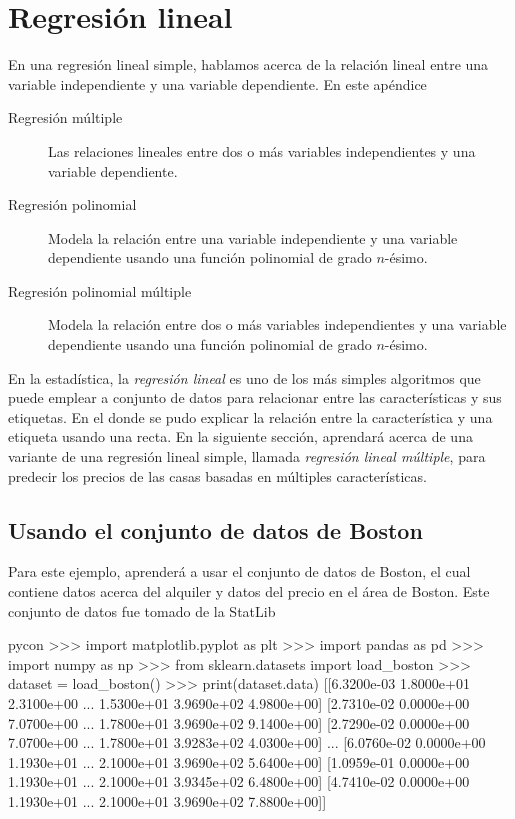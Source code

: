 \section{Regresión lineal}

En una regresión lineal simple, hablamos acerca de la relación lineal entre una variable independiente y una variable dependiente. En este apéndice

\begin{description}
	\item[Regresión múltiple] Las relaciones lineales entre dos o más variables independientes y una variable dependiente.
	\item[Regresión polinomial] Modela la relación entre una variable independiente y una variable dependiente usando una función polinomial de grado $n$-ésimo.
	\item[Regresión polinomial múltiple] Modela la relación entre dos o más variables independientes y una variable dependiente usando una función polinomial de grado $n$-ésimo.
\end{description}

En la estadística, la \emph{regresión lineal} es uno de los más simples algoritmos que puede emplear a conjunto de datos para relacionar entre las características y sus etiquetas. En el
donde se pudo explicar la relación entre la característica y una etiqueta usando una recta. En la siguiente sección, aprendará acerca de una variante de una regresión lineal simple, llamada \emph{regresión lineal múltiple}, para predecir los precios de las casas basadas en múltiples características.

\subsection{Usando el conjunto de datos de Boston}
Para este ejemplo, aprenderá a usar el conjunto de datos de Boston, el cual contiene datos acerca del alquiler y datos del precio en el área de Boston. Este conjunto de datos fue tomado de la StatLib

\begin{pygments}{pycon}
>>> import matplotlib.pyplot as plt
>>> import pandas as pd
>>> import numpy as np
>>> from sklearn.datasets import load_boston
>>> dataset = load_boston()
>>> print(dataset.data)
[[6.3200e-03 1.8000e+01 2.3100e+00 ... 1.5300e+01 3.9690e+02 4.9800e+00]
[2.7310e-02 0.0000e+00 7.0700e+00 ... 1.7800e+01 3.9690e+02 9.1400e+00]
[2.7290e-02 0.0000e+00 7.0700e+00 ... 1.7800e+01 3.9283e+02 4.0300e+00]
...
[6.0760e-02 0.0000e+00 1.1930e+01 ... 2.1000e+01 3.9690e+02 5.6400e+00]
[1.0959e-01 0.0000e+00 1.1930e+01 ... 2.1000e+01 3.9345e+02 6.4800e+00]
[4.7410e-02 0.0000e+00 1.1930e+01 ... 2.1000e+01 3.9690e+02 7.8800e+00]]
\end{pygments}

